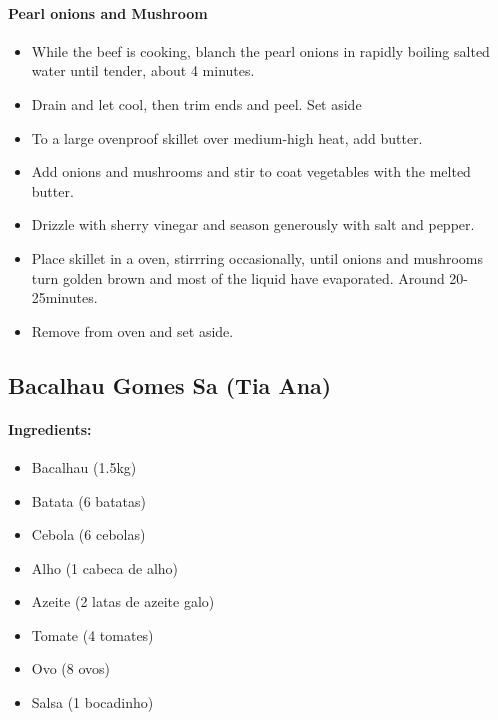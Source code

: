 \documentclass{article}
\begin{document}
\paragraph{Pearl onions and Mushroom}
\begin{itemize}
\item While the beef is cooking, blanch the pearl onions in rapidly boiling salted water until tender, about 4 minutes. \item Drain and let cool, then trim ends and peel. Set aside
\item To a large ovenproof skillet over medium-high heat, add butter.
\item Add onions and mushrooms and stir to coat vegetables with the melted butter.
\item Drizzle with sherry vinegar and season generously with salt and pepper.
\item Place skillet in a oven, stirrring occasionally, until onions and mushrooms turn golden brown and most of the liquid have evaporated. Around 20-25minutes.
\item Remove from oven and set aside.
\end{itemize}

\subsection{Bacalhau Gomes Sa (Tia Ana)}

\paragraph{Ingredients:}

\begin{itemize}
	\item Bacalhau (1.5kg)
	\item Batata (6 batatas)
	\item Cebola (6 cebolas)
	\item Alho (1 cabeca de alho)
	\item Azeite (2 latas de azeite galo)
	\item Tomate (4 tomates)
	\item Ovo (8 ovos)
	\item Salsa (1 bocadinho)
\end{itemize}
\end{document}
